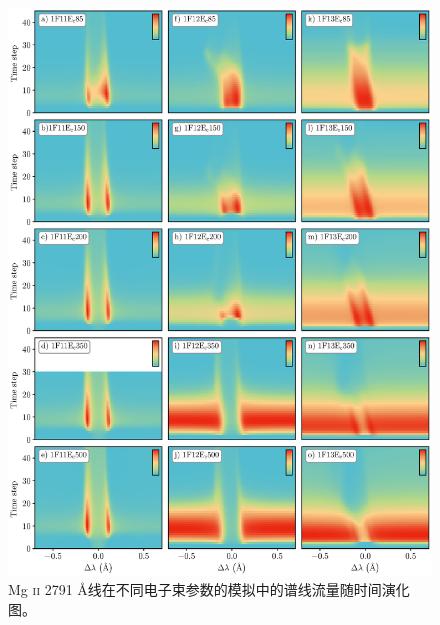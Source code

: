\begin{figure}
	\centering
	\includegraphics[width=\textwidth]{figs/dMe_MgII_2791}
	\caption{Mg \textsc{ii} 2791 \mbox{\AA}线在不同电子束参数的模拟中的谱线流量随时间演化图。}
	\label{fig:4.6}
\end{figure}

